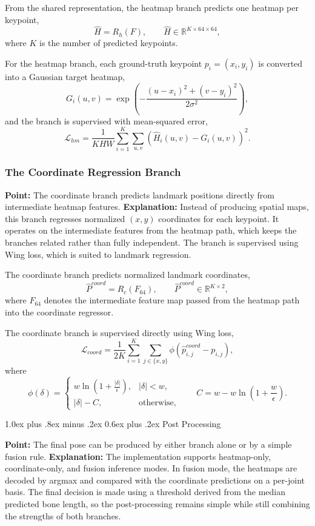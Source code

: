 \documentclass[10pt,letterpaper]{article}
\makeatletter
\renewcommand\subsection{\@startsection{subsection}{2}{\z@}%
  {1.0ex plus .8ex minus .2ex}%
  {0.6ex plus .2ex}%
  {\normalfont\itshape}}
\makeatother
\begin{document}
From the shared representation, the heatmap branch predicts one heatmap per keypoint,
\[
\hat{H} = R_h(F), \qquad \hat{H} \in \mathbb{R}^{K \times 64 \times 64},
\]
where $K$ is the number of predicted keypoints.

For the heatmap branch, each ground-truth keypoint $p_i = (x_i, y_i)$ is converted into a Gaussian target heatmap,
\[
G_i(u,v) = \exp\left(
-\frac{(u-x_i)^2 + (v-y_i)^2}{2\sigma^2}
\right),
\]
and the branch is supervised with mean-squared error,
\[
\mathcal{L}_{hm}
=
\frac{1}{KHW}
\sum_{i=1}^{K}
\sum_{u,v}
\left(\hat{H}_i(u,v) - G_i(u,v)\right)^2.
\]

\subsubsection{The Coordinate Regression Branch}

\noindent\textbf{Point:} The coordinate branch predicts landmark positions directly from intermediate heatmap features.  
\textbf{Explanation:} Instead of producing spatial maps, this branch regresses normalized $(x,y)$ coordinates for each keypoint. It operates on the intermediate features from the heatmap path, which keeps the branches related rather than fully independent. The branch is supervised using Wing loss, which is suited to landmark regression.

The coordinate branch predicts normalized landmark coordinates,
\[
\hat{P}^{coord} = R_c(F_{64}), \qquad \hat{P}^{coord} \in \mathbb{R}^{K \times 2},
\]
where $F_{64}$ denotes the intermediate feature map passed from the heatmap path into the coordinate regressor.

The coordinate branch is supervised directly using Wing loss,
\[
\mathcal{L}_{coord}
=
\frac{1}{2K}
\sum_{i=1}^{K}
\sum_{j \in \{x,y\}}
\phi\!\left(\hat{p}^{coord}_{i,j} - p_{i,j}\right),
\]
where
\[
\phi(\delta)=
\begin{cases}
w \ln\left(1 + \frac{|\delta|}{\epsilon}\right), & |\delta| < w, \\
|\delta| - C, & \text{otherwise,}
\end{cases}
\qquad
C = w - w \ln\left(1 + \frac{w}{\epsilon}\right).
\]

\subsection{Post Processing}

\noindent\textbf{Point:} The final pose can be produced by either branch alone or by a simple fusion rule.  
\textbf{Explanation:} The implementation supports heatmap-only, coordinate-only, and fusion inference modes. In fusion mode, the heatmaps are decoded by argmax and compared with the coordinate predictions on a per-joint basis. The final decision is made using a threshold derived from the median predicted bone length, so the post-processing remains simple while still combining the strengths of both branches.
\end{document}
